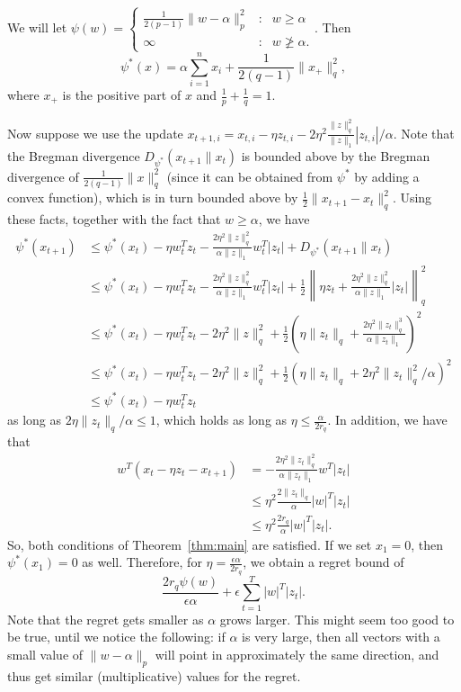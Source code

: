 \documentclass[11pt]{article}
\begin{document}
We will let $\psi(w) = \left\{ \begin{array}{ccl} \frac{1}{2(p-1)}\|w-\alpha\|_p^2 & : & w \geq \alpha \\ \infty & : & w \not\geq \alpha. \end{array} \right.$. 
Then 
\[ \psi^*(x) = \alpha \sum_{i=1}^n x_i + \frac{1}{2(q-1)}\|x_+\|_q^2, \]
where $x_+$ is the positive part of $x$ and $\frac{1}{p} + \frac{1}{q} = 1$.

Now suppose we use the update $x_{t+1,i} = x_{t,i} - \eta z_{t,i} - 2\eta^2 \frac{\|z\|_q^2}{\|z\|_1} |z_{t,i}| / \alpha$. 
Note that the Bregman divergence $D_{\psi^*}(x_{t+1} \| x_t)$ is bounded above by the Bregman divergence 
of $\frac{1}{2(q-1)}\|x\|_q^2$ (since it can be obtained from $\psi^*$ by adding a convex function), 
which is in turn bounded above by $\frac{1}{2}\|x_{t+1}-x_t\|_q^2$. Using these facts, together with the fact that 
$w \geq \alpha$, we have
\begin{align*}
\psi^*(x_{t+1}) &\leq \psi^*(x_t) - \eta w_t^Tz_t - \frac{2\eta^2\|z\|_q^2}{\alpha \|z\|_1} w_t^T|z_t| + D_{\psi^*}(x_{t+1} \| x_t) \\
 &\leq \psi^*(x_t) - \eta w_t^Tz_t - \frac{2\eta^2\|z\|_q^2}{\alpha \|z\|_1} w_t^T|z_t| + \frac{1}{2}\left\|\eta z_t + \frac{2\eta^2\|z\|_q^2}{\alpha \|z\|_1} |z_t|\right\|_q^2 \\
 &\leq \psi^*(x_t) - \eta w_t^Tz_t - 2\eta^2 \|z\|_q^2 + \frac{1}{2} \left(\eta \|z_t\|_q + \frac{2\eta^2\|z_t\|_q^3}{\alpha \|z_t\|_1}\right)^2 \\
 &\leq \psi^*(x_t) - \eta w_t^Tz_t - 2\eta^2 \|z\|_q^2 + \frac{1}{2} \left(\eta \|z_t\|_q + 2\eta^2 \|z_t\|_{q}^2 / \alpha\right)^2 \\
 &\leq \psi^*(x_t) - \eta w_t^Tz_t
\end{align*}
as long as $2\eta \|z_t\|_q/\alpha \leq 1$, which holds as long as $\eta \leq \frac{\alpha}{2r_q}$. In addition, we have that
\begin{align*}
w^T(x_{t} - \eta z_t - x_{t+1}) &= -\frac{2\eta^2\|z_t\|_q^2}{\alpha\|z_t\|_1}w^T|z_t| \\
 &\leq \eta^2 \frac{2\|z_t\|_q}{\alpha} |w|^T|z_t| \\
 &\leq \eta^2 \frac{2r_q}{\alpha} |w|^T|z_t|.
\end{align*}
So, both conditions of Theorem~\ref{thm:main} are satisfied. 
If we set $x_1 = 0$, then $\psi^*(x_1) = 0$ as well.
Therefore, for $\eta = \frac{\epsilon \alpha}{2r_q}$, we obtain a regret bound of 
\[ \frac{2r_q\psi(w)}{\epsilon \alpha} + \epsilon \sum_{t=1}^T |w|^T|z_t|. \]
Note that the regret gets smaller as $\alpha$ grows larger. This might seem too good 
to be true, until we notice the following: if $\alpha$ is very large, then all 
vectors with a small value of $\|w-\alpha\|_p$ will point in approximately the same 
direction, and thus get similar (multiplicative) values for the regret.
\end{document}
